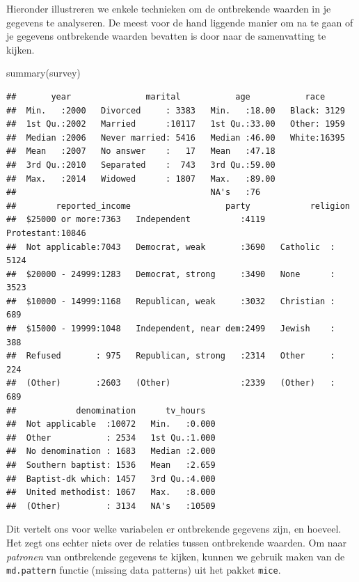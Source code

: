 \documentclass[]{tufte-book}
\newenvironment{Shaded}{}{}
\newcommand{\FunctionTok}[1]{\textcolor[rgb]{0.02,0.16,0.49}{#1}}
\newcommand{\NormalTok}[1]{#1}
\begin{document}
Hieronder illustreren we enkele technieken om de ontbrekende waarden in je gegevens te analyseren. De meest voor de hand liggende manier om na te gaan of je gegevens ontbrekende waarden bevatten is door naar de samenvatting te kijken.

\begin{Shaded}
\begin{Highlighting}[]
\FunctionTok{summary}\NormalTok{(survey)}
\end{Highlighting}
\end{Shaded}

\begin{verbatim}
##       year               marital           age           race      
##  Min.   :2000   Divorced     : 3383   Min.   :18.00   Black: 3129  
##  1st Qu.:2002   Married      :10117   1st Qu.:33.00   Other: 1959  
##  Median :2006   Never married: 5416   Median :46.00   White:16395  
##  Mean   :2007   No answer    :   17   Mean   :47.18                
##  3rd Qu.:2010   Separated    :  743   3rd Qu.:59.00                
##  Max.   :2014   Widowed      : 1807   Max.   :89.00                
##                                       NA's   :76                   
##        reported_income                   party            religion    
##  $25000 or more:7363   Independent          :4119   Protestant:10846  
##  Not applicable:7043   Democrat, weak       :3690   Catholic  : 5124  
##  $20000 - 24999:1283   Democrat, strong     :3490   None      : 3523  
##  $10000 - 14999:1168   Republican, weak     :3032   Christian :  689  
##  $15000 - 19999:1048   Independent, near dem:2499   Jewish    :  388  
##  Refused       : 975   Republican, strong   :2314   Other     :  224  
##  (Other)       :2603   (Other)              :2339   (Other)   :  689  
##            denomination      tv_hours    
##  Not applicable  :10072   Min.   :0.000  
##  Other           : 2534   1st Qu.:1.000  
##  No denomination : 1683   Median :2.000  
##  Southern baptist: 1536   Mean   :2.659  
##  Baptist-dk which: 1457   3rd Qu.:4.000  
##  United methodist: 1067   Max.   :8.000  
##  (Other)         : 3134   NA's   :10509
\end{verbatim}

Dit vertelt ons voor welke variabelen er ontbrekende gegevens zijn, en hoeveel. Het zegt ons echter niets over de relaties tussen ontbrekende waarden. Om naar \emph{patronen} van ontbrekende gegevens te kijken, kunnen we gebruik maken van de \texttt{md.pattern} functie (missing data patterns) uit het pakket \texttt{mice}.
\end{document}
